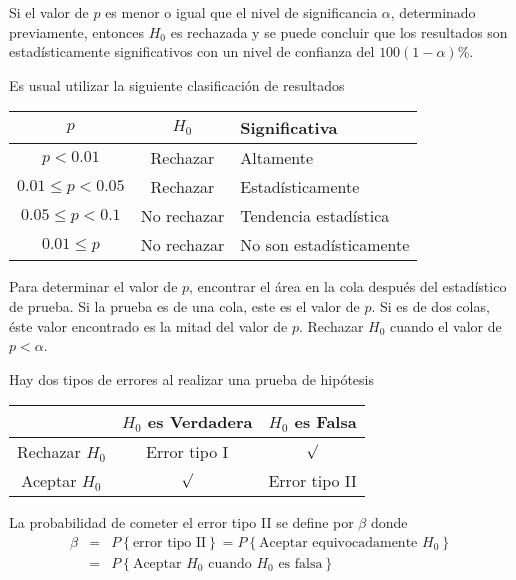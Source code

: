 \begin{Def}
Si el valor de $p$ es menor o igual que el nivel de significancia $\alpha$, determinado previamente, entonces $H_{0}$ es rechazada y se puede concluir que los resultados son estad\'isticamente significativos con un nivel de confianza del $100\left(1-\alpha\right)\%$.
\end{Def}
Es usual utilizar la siguiente clasificaci\'on de resultados


\begin{tabular}{|c||c|l|}\hline
$p$& $H_{0}$&Significativa\\\hline\hline
$p<0.01$&Rechazar &Altamente\\\hline
$0.01\leq p<0.05$ & Rechazar&Estad\'isticamente\\\hline
$0.05\leq p <0.1$ & No rechazar & Tendencia estad\'istica\\\hline
$0.01\leq p$ & No rechazar & No son estad\'isticamente\\\hline
\end{tabular}





\begin{Note}
Para determinar el valor de $p$, encontrar el \'area en la cola despu\'es del estad\'istico de prueba. Si la prueba es de una cola, este es el valor de $p$. Si es de dos colas, \'este valor encontrado es la mitad del valor de $p$. Rechazar $H_{0}$ cuando el valor de $p<\alpha$.
\end{Note}

Hay dos tipos de errores al realizar una prueba de hip\'otesis
\begin{center}
\begin{tabular}{c|cc}
& $H_{0}$ es Verdadera & $H_{0}$ es Falsa\\\hline\hline
Rechazar $H_{0}$ & Error tipo I & $\surd$\\
Aceptar $H_{0}$ & $\surd$ & Error tipo II
\end{tabular}
\end{center}






\begin{Def}
La probabilidad de cometer el error tipo II se define por $\beta$ donde
\begin{eqnarray*}
\beta&=&P\left\{\textrm{error tipo II}\right\}=P\left\{\textrm{Aceptar equivocadamente }H_{0}\right\}\\
&=&P\left\{\textrm{Aceptar }H_{0}\textrm{ cuando }H_{0}\textrm{ es falsa}\right\}
\end{eqnarray*}
\end{Def}

